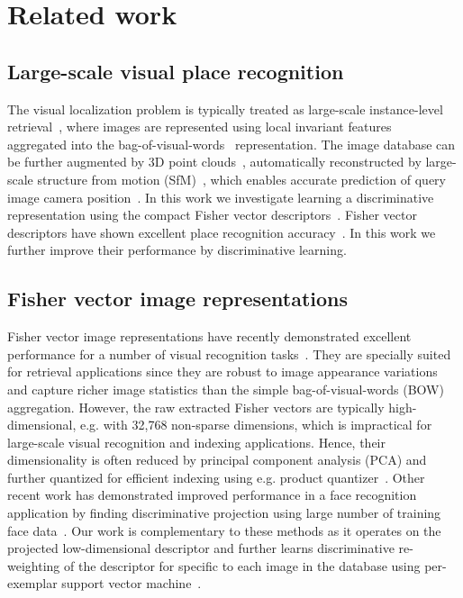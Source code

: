 \documentclass[table]{article} %
\begin{document}
\section{Related work} 
\label{sec:related}

\subsection*{Large-scale visual place recognition} \vspace{-3mm}
    The visual localization problem is typically treated as large-scale instance-level retrieval~\cite{Cummins09,Chen11,Gronat2013,Knopp2010,Schindler07,Torii2013,Zamir10}, where images are represented using local invariant
    features~\cite{Lowe04} aggregated into the bag-of-visual-words~\cite{Csurka04,Sivic03} representation. 
    The image database can be further augmented by 3D point clouds~\cite{Klinger13}, automatically
    reconstructed by large-scale structure from motion
    (SfM)~\cite{Agarwal-ICCV-2009,Klinger13}, which enables
    accurate prediction of query image camera
    position~\cite{Li12,Sattler12}.
    In this work we investigate learning a discriminative representation using the compact Fisher vector descriptors~\cite{Jegou12}.
    Fisher vector descriptors have shown excellent place recognition accuracy~\cite{Torii2013}. In this work we further
    improve their performance by discriminative learning.

\vspace{-3mm}
\subsection*{Fisher vector image representations} \vspace{-3mm}
    Fisher vector image representations have recently demonstrated excellent performance for a number of visual recognition tasks~\cite{Chatfield11,Jegou12,Krapac2011,Simonyan2013}.
    They are specially suited for retrieval applications since they are robust to image appearance variations and capture richer image statistics than the simple bag-of-visual-words (BOW) aggregation. However, the raw extracted Fisher vectors are typically high-dimensional, e.g. with 32,768 non-sparse dimensions, which is impractical for large-scale visual recognition and indexing applications. Hence, their dimensionality is often reduced by principal component analysis (PCA) and further quantized for efficient indexing using e.g. product quantizer~\cite{Jegou12}.  Other recent work has demonstrated improved performance in a face recognition application by finding discriminative projection using large number of training face data~\cite{Simonyan2013}. Our work is complementary to these methods as it operates on the projected low-dimensional descriptor and further learns discriminative re-weighting of the descriptor for specific to each image in the database using per-exemplar support vector machine~\cite{Malisiewicz11}.
\end{document}
